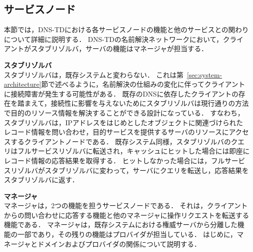 \subsection{サービスノード}
本節では，DNS-TDにおける各サービスノードの機能と他のサービスとの関わりについて詳細に説明する．
DNS-TDの名前解決ネットワークにおいて，クライアントがスタブリゾルバ，サーバの機能はマネージャが担当する．\newline

\hspace{-12pt}\textbf{スタブリゾルバ}\\
\hspace{12pt}スタブリゾルバは，既存システムと変わらない．
これは第~\ref{sec:system-architecture}節で述べるように，名前解決の仕組みの変化に伴ってクライアントに接続障害が発生する可能性がある．
既存のDNSに依存したクライアントの存在を踏まえて，接続性に影響を与えないためにスタブリゾルバは現行通りの方法で目的のリソース情報を解決することができる設計になっている．
すなわち，スタブリゾルバは，IPアドレスをはじめとしたオブジェクトに関連づけられたレコード情報を問い合わせ，目的サービスを提供するサーバのリソースにアクセスするクライアントノードである．
既存システム同様，スタブリゾルバのクエリはフルサービスリゾルバに転送され，キャッシュにヒットした場合には即座にレコード情報の応答結果を取得する．
ヒットしなかった場合には，フルサービスリゾルバがスタブリゾルバに変わって，サーバにクエリを転送し，応答結果をスタブリゾルバに返す．\newline

\hspace{-12pt}\textbf{マネージャ}\\
\hspace{12pt} マネージャは，2つの機能を担うサービスノードである．
それは，クライアントからの問い合わせに応答する機能と他のマネージャに操作リクエストを転送する機能である．
マネージャは，既存システムにおける権威サーバから分離した機能の一部であり，その残りの機能はプロバイダが担当している．
はじめに，マネージャとドメインおよびプロバイダの関係について説明する．

